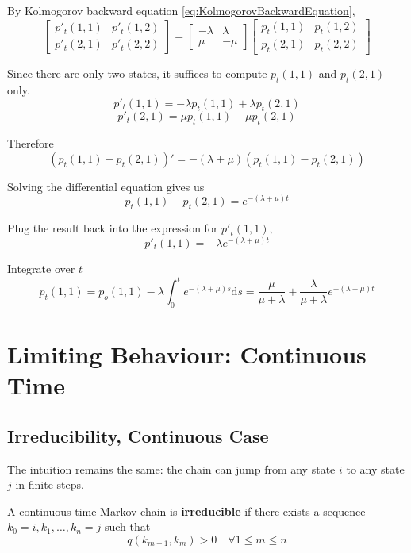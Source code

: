         By Kolmogorov backward equation \ref{eq:KolmogorovBackwardEquation},
        \[
        \begin{bmatrix}
            p'_t(1,1) & p'_t(1,2)\\
            p'_t(2,1) & p'_t(2,2)
        \end{bmatrix} = 
        \begin{bmatrix}
            -\lambda & \lambda\\
            \mu & -\mu
        \end{bmatrix}
        \begin{bmatrix}
            p_t(1,1) & p_t(1,2)\\
            p_t(2,1) & p_t(2,2)
        \end{bmatrix}
        \]

        Since there are only two states, it suffices to compute $p_t(1,1)$ and $p_t(2,1)$ only.
        \[ p'_t(1,1) = -\lambda p_t(1,1) + \lambda p_t(2,1) \]
        \[ p'_t(2,1) = \mu p_t(1,1) - \mu p_t(2,1) \]

        Therefore
        \[ \left(p_t(1,1)-p_t(2,1)\right)' = -(\lambda + \mu)\left(p_t(1,1)-p_t(2,1)\right) \]

        Solving the differential equation gives us
        \[ p_t(1,1) - p_t(2,1) = e^{-(\lambda + \mu)t} \]

        Plug the result back into the expression for $p'_t(1,1)$,
        \[ p'_t(1,1) = -\lambda e^{-(\lambda + \mu)t} \]

        Integrate over $t$
        \[ p_t(1,1) = p_o(1,1) - \lambda\int_0^t e^{-(\lambda + \mu)s}\mathrm{d}s = \frac{\mu}{\mu + \lambda}+\frac{\lambda}{\mu + \lambda} e^{-(\lambda + \mu)t} \]


\section{Limiting Behaviour: Continuous Time}
    \subsection{Irreducibility, Continuous Case}
        The intuition remains the same: the chain can jump from any state $i$ to any state $j$ in finite steps.
        \begin{definition}
            A continuous-time Markov chain is \textbf{irreducible} if there exists a sequence $k_0 = i, k_1, \dots, k_n=j$ such that
            \[ q(k_{m-1},k_m) > 0 \quad \forall 1 \le m \le n \]
        \end{definition}


